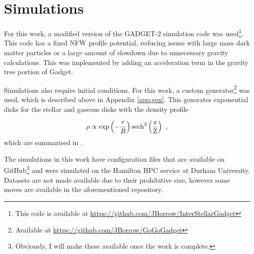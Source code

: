 \section{Simulations}\label{app:sims}

For this work, a modified version of the GADGET-2 simulation code \citep{springel_cosmological_2005} was
used\footnote{This code is available at
  \url{https://github.com/JBorrow/InterStellarGadget}}. This code has a fixed
NFW profile potential, reducing issues with large mass dark matter
particles or a large amount of slowdown due to unnecessary gravity
calculations. This was implemented by adding an acceleration term in the
gravity tree portion of Gadget.

Simulations also require initial conditions. For this work, a custom
generator\footnote{Available at \url{https://github.com/JBorrow/GoGoGadget}}
was used, which is described above in Appendix \ref{app:gen}. This generates exponential disks for the stellar and gaseous
disks with the density profile

\begin{equation}
\rho \propto \exp\left(-\frac{r}{R}\right)\rm{sech}^2\left(\frac{z}{Z}\right)~,
\end{equation}
which are summarised in \citet{ferriere_interstellar_2001}.

The simulations in this work have configuration files that are
available on GitHub\footnote{Obviously, I will make these available once the work is complete.} and were simulated on the
Hamilton HPC service at Durham University. Datasets are not made
available due to their prohibitive size, however some moves are
available in the aforementioned repository.


